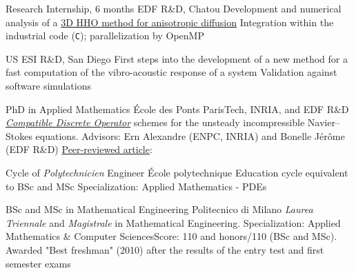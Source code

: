 \documentclass[english]{RMcv}
\begin{document}
%
%
        {Research Internship, 6 months}%
        {EDF R\&D, Chatou}%
        {Development and numerical analysis of a \href{\tesilink}{3D HHO method for anisotropic diffusion}}%
        {Integration within the industrial code \cs{} (\texttt{C}); parallelization by OpenMP}


%
%
        {US ESI R\&D, San Diego}%
        {First steps into the development of a new method for a fast computation of the vibro-acoustic response of a system}%
        {Validation against software simulations}


%

\vspace{8pt}


%
        {PhD in Applied Mathematics}%
        {\'Ecole des Ponts ParisTech, INRIA, and EDF R\&D}%
        {\href{\PhDlink}{\emph{Compatible Discrete Operator}} schemes for the unsteady incompressible Navier–Stokes equations. Advisors: Ern Alexandre (ENPC, INRIA) and Bonelle J\'er\^ome (EDF R\&D)}%
        {\href{\articlelink}{Peer-reviewed article}: \article{}}



%
%
        {Cycle of \textit{Polytechnicien} Engineer}%
        {\'Ecole polytechnique}%
        {Education cycle equivalent to BSc and MSc}%
        {Specialization: Applied Mathematics - PDEs}


%
%
        {BSc and MSc in Mathematical Engineering}%
        {Politecnico di Milano}%
        {\emph{Laurea Triennale} and \emph{Magistrale} in Mathematical Engineering. Specialization: Applied Mathematics \& Computer Sciences}{Score: 110 and honors/110 (BSc and MSc). Awarded "Best freshman" (2010) after the results of the entry test and first semester exams}
\end{document}
